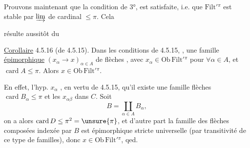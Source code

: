 Prouvons maintenant que  la condition de 3°,  est satisfaite, i.e. que $\mathrm{Filt}'{}^\pi$ est stable par $\varinjlim$ de cardinal $\leq\pi$. Cela

résulte aussitôt du

\uline{Corollaire} 4.5.16 (de 4.5.15). Dans les conditions de 4.5.15,  ,
 une famille \uline{épimorphique}  $(x_\alpha\longrightarrow x)_{\alpha\in A}$ de flèches , avec $x_\alpha\in\mathrm{Ob}\,\mathrm{Filt}'{}^\pi$ pour $\forall\alpha\in A$, et $\operatorname{card}A\leq\pi$. Alors $x\in\mathrm{Ob}\,\mathrm{Filt}'{}^\pi$.

En effet, l'hyp.  $x_\alpha$  , en vertu de 4.5.15, qu'il existe une famille   flèches
   $\operatorname{card}B_\alpha\leq\pi$ et les $x_{\alpha\beta}$ dans $C$. Soit
\[
B=\coprod_{\alpha\in A}B_\alpha,
\]
on a alors $\operatorname{card}D\leq\pi^2=\unsure{\pi}$, et d'autre part la famille des flèches composées
indexée par $B$ est épimorphique stricte universelle (par transitivité de ce type de familles), donc $x\in\mathrm{Ob}\,\mathrm{Filt}'{}^\pi$, qed.

